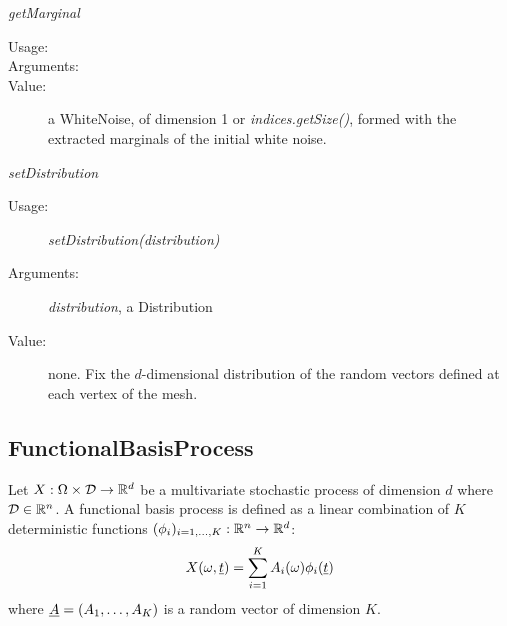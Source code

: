 \begin{description}
\begin{description}
\item \textit{getMarginal}
\begin{description}
\item[Usage:] \rule{0pt}{1em}
\item[Arguments:] \rule{0pt}{1em}
\item[Value:] a WhiteNoise, of dimension 1 or \textit{indices.getSize()}, formed with the extracted marginals of the initial white noise.
\end{description}
\bigskip

\item \textit{setDistribution}
\begin{description}
\item[Usage:] \textit{setDistribution(distribution)}
\item[Arguments:] \textit{distribution}, a Distribution
\item[Value:] none. Fix the $d$-dimensional distribution of the random vectors defined at each vertex of the mesh.
\end{description}
\bigskip

\end{description}

\end{description}




\newpage
\subsection{FunctionalBasisProcess}

Let $X: \Omega \times {\mathcal D} \rightarrow {\mathbb R}^d$  be a multivariate stochastic process of dimension $d$ where ${\mathcal D} \in {\mathbb R}^n$. A functional basis process is defined as a linear combination of $K$ deterministic functions $(\phi_i)_{i=1,\dots,K}: {\mathbb R}^n \rightarrow {\mathbb R}^d$:
\begin{align*}
X(\omega,{\underline{t}})=\sum_{i=1}^KA_i(\omega)\phi_i({\underline{t}})
\end{align*}
where ${\underline{A}}=(A_1,\dots, A_K)$ is a random vector of dimension $K$.\\




